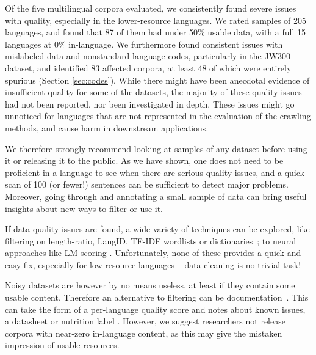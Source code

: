 Of the five multilingual corpora evaluated, we consistently found severe issues with quality, especially in the lower-resource languages. We rated samples of 205 languages, and found that 87 of them had under 50\% usable data, with a full 15 languages at 0\% in-language. We furthermore found consistent issues with mislabeled data and nonstandard language codes, particularly in the JW300 dataset, and identified 83 affected corpora, at least 48 of which were entirely spurious (Section \ref{sec:codes}). While there might have been anecdotal evidence of insufficient quality for some of the datasets, the majority of these quality issues had not been reported, nor been investigated in depth. These issues might go unnoticed for languages that are not represented in the evaluation of the crawling methods, and cause harm in downstream applications.

We therefore strongly recommend looking at samples of any dataset before using it or releasing it to the public. As we have shown, one does not need to be proficient in a language to see when there are serious quality issues, and a quick scan of 100 (or fewer!) sentences can be sufficient to detect major problems. Moreover, going through and annotating a small sample of data can bring useful insights about new ways to filter or use it.

If data quality issues are found, a wide variety of techniques can be explored, like filtering on length-ratio, LangID, TF-IDF wordlists \cite{caswell-etal-2020-language} or dictionaries~\citep{kamholz-etal-2014-panlex}; to neural approaches like LM scoring \cite{axelrod-etal-2011-domain,moore-lewis-2010-intelligent,wang-etal-2018-denoising}. Unfortunately, none of these provides a quick and easy fix, especially for low-resource languages -- data cleaning is no trivial task!

Noisy datasets are however by no means useless, at least if they contain some usable content. Therefore an alternative to filtering can be documentation~\citep{bender-etal-2021-on}. This can take the form of a per-language quality score and notes about known issues,
a datasheet \citep{gebru-etal-2018-datasheets} or nutrition label \citep{holland-etal-2018-the}. However, we suggest researchers not release corpora with near-zero in-language content, as this may give the mistaken impression of usable resources.

